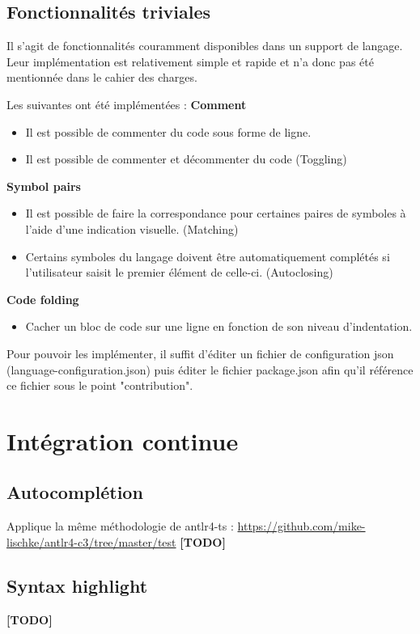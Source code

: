 \documentclass[
    iict, %
    il, %
]{heig-tb}
\begin{document}
\section{Fonctionnalités triviales}
Il s'agit de fonctionnalités couramment disponibles dans un support de langage. Leur implémentation est relativement simple et rapide et n'a donc pas été mentionnée dans le cahier des charges.

Les suivantes ont été implémentées :
\textbf{Comment}
\begin{itemize}
    \item Il est possible de commenter du code sous forme de ligne.
    \item Il est possible de commenter et décommenter du code (Toggling)
\end{itemize}

\textbf{Symbol pairs}
\begin{itemize}
    \item Il est possible de faire la correspondance pour certaines paires de symboles à l'aide d'une indication visuelle. (Matching)
    \item Certains symboles du langage doivent être automatiquement complétés si l'utilisateur saisit le premier élément de celle-ci. (Autoclosing)
\end{itemize}

\textbf{Code folding}
\begin{itemize}
    \item Cacher un bloc de code sur une ligne en fonction de son niveau d'indentation.
\end{itemize}

Pour pouvoir les implémenter, il suffit d'éditer un fichier de configuration json (language-configuration.json) puis  éditer le fichier package.json afin qu'il référence ce fichier sous le point "contribution".

\chapter{Intégration continue}

\section{Autocomplétion}
Applique la même méthodologie de antlr4-ts : \href{https://github.com/mike-lischke/antlr4-c3/tree/master/test}{https://github.com/mike-lischke/antlr4-c3/tree/master/test}
\textbf{[TODO]}

\section{Syntax highlight}
\textbf{[TODO]}
\end{document}
